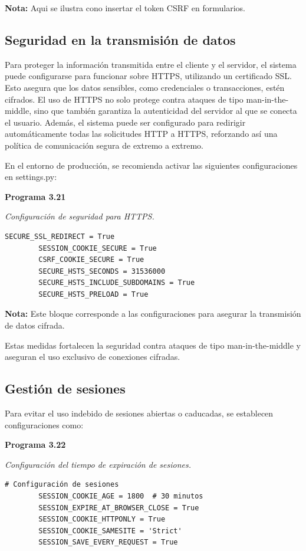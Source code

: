 	\textbf{Nota:} Aqui se ilustra cono insertar el token CSRF en formularios.
	
\subsection{Seguridad en la transmisión de datos}
	
	Para proteger la información transmitida entre el cliente y el servidor, el sistema puede configurarse para funcionar sobre HTTPS, utilizando un certificado SSL. Esto asegura que los datos sensibles, como credenciales o transacciones, estén cifrados. El uso de HTTPS no solo protege contra ataques de tipo man-in-the-middle, sino que también garantiza la autenticidad del servidor al que se conecta el usuario. Además, el sistema puede ser configurado para redirigir automáticamente todas las solicitudes HTTP a HTTPS, reforzando así una política de comunicación segura de extremo a extremo.
	
	En el entorno de producción, se recomienda activar las siguientes configuraciones en settings.py:

	\textbf{Programa 3.21}
	
	\textit{Configuración de seguridad para HTTPS.} %
	\vspace{0.3cm} %
	\begin{lstlisting}[lineskip=-1pt]
		SECURE_SSL_REDIRECT = True
		SESSION_COOKIE_SECURE = True
		CSRF_COOKIE_SECURE = True
		SECURE_HSTS_SECONDS = 31536000
		SECURE_HSTS_INCLUDE_SUBDOMAINS = True
		SECURE_HSTS_PRELOAD = True
	\end{lstlisting}
	
	\textbf{Nota:} Este bloque corresponde a las configuraciones para asegurar la transmisión de datos cifrada.

	Estas medidas fortalecen la seguridad contra ataques de tipo man-in-the-middle y aseguran el uso exclusivo de conexiones cifradas.

\subsection{Gestión de sesiones}

	Para evitar el uso indebido de sesiones abiertas o caducadas, se establecen configuraciones como:
	
	\textbf{Programa 3.22}
	
	\textit{Configuración del tiempo de expiración de sesiones.} %
	\vspace{0.3cm} %
	\begin{lstlisting}[lineskip=-1pt]
		# Configuración de sesiones
		SESSION_COOKIE_AGE = 1800  # 30 minutos
		SESSION_EXPIRE_AT_BROWSER_CLOSE = True
		SESSION_COOKIE_HTTPONLY = True
		SESSION_COOKIE_SAMESITE = 'Strict'
		SESSION_SAVE_EVERY_REQUEST = True
	\end{lstlisting}
	
